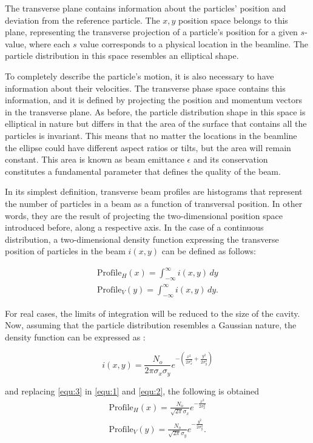\documentclass{article}
\begin{document}
The transverse plane contains information about the particles' position and deviation from the reference particle. The $x, y$ position space belongs to this plane, representing the transverse projection of a particle's position for a given $s$-value, where each $s$ value corresponds to a physical location in the beamline. The particle distribution in this space resembles an elliptical shape.

To completely describe the particle's motion, it is also necessary to have information about their velocities. The transverse phase space contains this information, and it is defined by projecting the position and momentum vectors in the transverse plane. As before, the particle distribution shape in this space is elliptical in nature but differs in that the area of the surface that contains all the particles is invariant. This means that no matter the locations in the beamline the ellipse could have different aspect ratios or tilts, but the area will remain constant. This area is known as beam emittance $\epsilon$ and its conservation constitutes a fundamental parameter that defines the quality of the beam.

In its simplest definition, transverse beam profiles are histograms that represent the number of particles in a beam as a function of transversal position. In other words, they are the result of projecting the two-dimensional position space introduced before, along a respective axis. In the case of a continuous distribution, a two-dimensional density function expressing the transverse position of particles in the beam $i(x, y)$ can be defined as follows: 
    
\begin{gather} 
\mathrm{Profile}_{H}(x) = \int_{-\infty}^{\infty} i(x, y)\,dy \label{equ:1}\\ 
\mathrm{Profile}_{V}(y) = \int_{-\infty}^{\infty} i(x, y)\,dy \label{equ:2}.
\end{gather}

For real cases, the limits of integration will be reduced to the size of the cavity. Now, assuming that the particle distribution resembles a Gaussian nature, the density function can be expressed as : 

\begin{equation} 
i(x, y) = \frac{N_{o}}{2\pi\sigma_{x}\sigma_{y}}e^{-(\frac{x^{2}}{2\sigma_{x}^{2}} + \frac{y^{2}}{2\sigma_{y}^{2}})}  \label{equ:3}
\end{equation}

and replacing \ref{equ:3} in \ref{equ:1} and \ref{equ:2}, the following is obtained
\begin{gather}
\mathrm{Profile}_{H}(x)= \frac{N_o}{\sqrt{2\pi}\sigma_{x}} e^{-\frac{x^{2}}{2\sigma_{x}^{2}}} \\
\mathrm{Profile}_{V}(y)= \frac{N_o}{\sqrt{2\pi}\sigma_{y}}e^{-\frac{y^2}{2\sigma_{y}^{2}}}.
\end{gather}  
\end{document}

